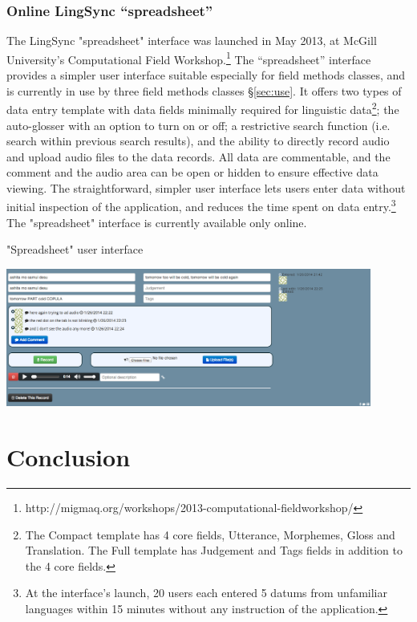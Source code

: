 \documentclass[letterpaper, 12pt, dvips]{mitwpl}
\begin{document}
\subsubsection{Online LingSync ``spreadsheet'' }
\label{sec:spreadsheet}

The LingSync "spreadsheet" interface was launched in May 2013, at McGill University's Computational Field Workshop.\footnote{http://migmaq.org/workshops/2013-computational-fieldworkshop/} The ``spreadsheet''  interface provides a simpler user interface suitable especially for field methods classes, and is currently in use by three field methods classes \S \ref{sec:use}. It offers two types of data entry template with data fields minimally required for linguistic data\footnote{The Compact template has 4 core fields, Utterance, Morphemes, Gloss and Translation. The Full template has Judgement and Tags fields in addition to the 4 core fields.}; the auto-glosser with an option to turn on or off; a restrictive search function (i.e. search within previous search results), and the ability to directly record audio and upload audio files to the data records. All data are commentable, and the comment and the audio area can be  open or hidden to ensure effective data viewing. The straightforward, simpler user interface lets users enter data without initial inspection of the application, and reduces the time spent on data entry.\footnote{At the interface's launch, 20 users each entered 5 datums from unfamiliar languages within 15 minutes without any instruction of the application.}  The "spreadsheet" interface is currently available only online.     

\begin{exe} 
\ex "Spreadsheet" user interface

 \centring
   \includegraphics[width=0.9\textwidth]{spreadsheetinterface.png}

\label{ex:bots}
\end{exe} 



\section{Conclusion } 
\label{sec:conclusion}
\end{document}
